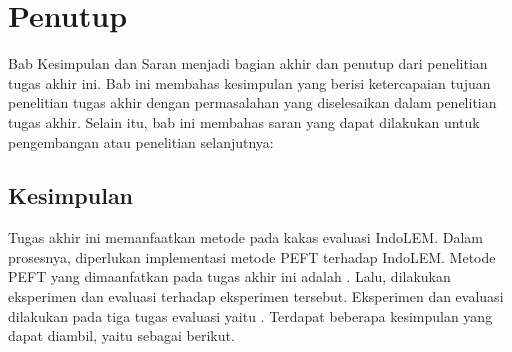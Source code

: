 \chapter{Penutup}

Bab Kesimpulan dan Saran  menjadi bagian akhir dan penutup dari penelitian tugas akhir ini. Bab ini  membahas kesimpulan yang berisi ketercapaian tujuan penelitian tugas akhir dengan permasalahan yang diselesaikan dalam penelitian tugas akhir. Selain itu, bab ini  membahas saran yang dapat dilakukan untuk pengembangan atau penelitian selanjutnya:

\section{Kesimpulan}

Tugas akhir ini memanfaatkan metode \PEFT pada kakas evaluasi IndoLEM. Dalam prosesnya, diperlukan implementasi metode PEFT terhadap IndoLEM. Metode PEFT yang dimaanfatkan pada tugas akhir ini adalah \methodPEFT. Lalu, dilakukan eksperimen dan evaluasi terhadap eksperimen tersebut. Eksperimen dan evaluasi dilakukan pada tiga tugas evaluasi yaitu \nlptask. Terdapat beberapa kesimpulan yang dapat diambil, yaitu sebagai berikut.

